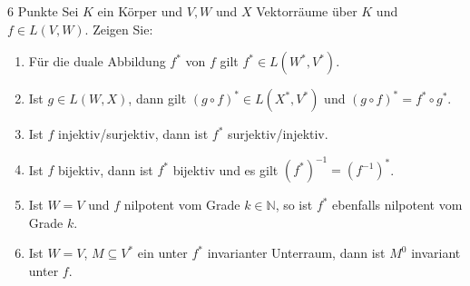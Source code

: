 \documentclass{problemset}
\begin{document}
\begin{problem}{6 Punkte}
Sei $K$ ein Körper und $V, W$ und $X$ Vektorräume über $K$ und $f \in L(V, W)$. Zeigen Sie:
\begin{enumerate}
    \item Für die duale Abbildung $f^*$ von $f$ gilt $f^* \in L(W^*, V^*)$.
    \item Ist $g \in L(W, X)$, dann gilt $(g \circ f)^* \in L(X^*, V^*)$ und $(g \circ
              f)^* = f^* \circ g^*$.
    \item Ist $f$ injektiv/surjektiv, dann ist $f^*$ surjektiv/injektiv.
    \item Ist $f$ bijektiv, dann ist $f^*$ bijektiv und es gilt $(f^*)^{-1} =
              (f^{-1})^*$.
    \item Ist $W = V$ und $f$ nilpotent vom Grade $k \in \mathbb{N}$, so ist $f^*$
          ebenfalls nilpotent vom Grade $k$.
    \item Ist $W = V$, $M \subseteq V^*$ ein unter $f^*$ invarianter Unterraum, dann ist
          $M^0$ invariant unter $f$.
\end{enumerate}
\end{problem}
\end{document}
